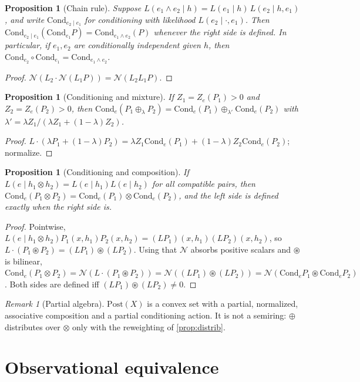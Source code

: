 \documentclass[11pt]{article}
\newtheorem{proposition}[theorem]{Proposition}
\theoremstyle{definition}
\theoremstyle{remark}
\newtheorem{remark}[theorem]{Remark}
\newcommand{\Post}{\mathrm{Post}}
\newcommand{\Cond}{\mathrm{Cond}}
\newcommand{\N}{\mathcal{N}}
\newcommand{\cp}{\circledast}
\begin{document}
\begin{proposition}[Chain rule]
Suppose $L(e_1\wedge e_2\mid h)=L(e_1\mid h)\,L(e_2\mid h,e_1)$, and write $\Cond_{e_2\mid e_1}$ for
conditioning with likelihood $L(e_2\mid\cdot,e_1)$. Then
$\Cond_{e_2\mid e_1}(\Cond_{e_1}P)=\Cond_{e_1\wedge e_2}(P)$ whenever the right side is defined. In
particular, if $e_1,e_2$ are conditionally independent given $h$, then
$\Cond_{e_2}\circ\Cond_{e_1}=\Cond_{e_1\wedge e_2}$.
\end{proposition}
\begin{proof}
$\N(L_2\cdot\N(L_1P))=\N(L_2L_1P)$.
\end{proof}

\begin{proposition}[Conditioning and mixture]
If $Z_1=Z_e(P_1)>0$ and $Z_2=Z_e(P_2)>0$, then
$\Cond_e(P_1\oplus_\lambda P_2)=\Cond_e(P_1)\oplus_{\lambda'}\Cond_e(P_2)$ with
$\lambda'=\lambda Z_1/(\lambda Z_1+(1-\lambda)Z_2)$.
\end{proposition}
\begin{proof}
$L\cdot(\lambda P_1+(1-\lambda)P_2)=\lambda Z_1\Cond_e(P_1)+(1-\lambda)Z_2\Cond_e(P_2)$; normalize.
\end{proof}

\begin{proposition}[Conditioning and composition]\label{prop:cond-comp}
If $L(e\mid h_1\otimes h_2)=L(e\mid h_1)L(e\mid h_2)$ for all compatible pairs, then
$\Cond_e(P_1\otimes P_2)=\Cond_e(P_1)\otimes\Cond_e(P_2)$, and the left side is defined exactly when
the right side is.
\end{proposition}
\begin{proof}
Pointwise, $L(e\mid h_1\otimes h_2)P_1(x,h_1)P_2(x,h_2)=(LP_1)(x,h_1)(LP_2)(x,h_2)$, so
$L\cdot(P_1\cp P_2)=(LP_1)\cp(LP_2)$. Using that $\N$ absorbs positive scalars and $\cp$ is
bilinear, $\Cond_e(P_1\otimes P_2)=\N(L\cdot(P_1\cp P_2))=\N((LP_1)\cp(LP_2))
=\N(\Cond_eP_1\cp\Cond_eP_2)$. Both sides are defined iff $(LP_1)\cp(LP_2)\ne0$.
\end{proof}

\begin{remark}[Partial algebra]
$\Post(X)$ is a convex set with a partial, normalized, associative composition and a partial
conditioning action. It is not a semiring: $\oplus$ distributes over $\otimes$ only with the
reweighting of \cref{prop:distrib}.
\end{remark}

\section{Observational equivalence}\label{sec:obs}
\end{document}
